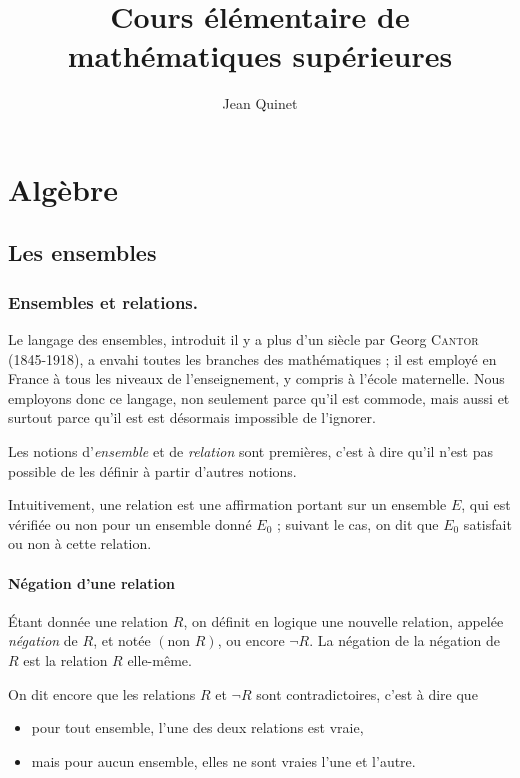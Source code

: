 \documentclass[12pt,parskip=full,chapterprefix=true,a5paper]{scrbook}
\title{Cours élémentaire de mathématiques supérieures}
\author{Jean Quinet}
\begin{document}
\frontmatter

\maketitle
\tableofcontents

\mainmatter

\part{Algèbre}

\chapter{Les ensembles}

\section{Ensembles et relations.}

Le langage des ensembles, introduit il y a plus d'un siècle par Georg
\textsc{Cantor} (1845-1918), a envahi toutes les branches des mathématiques ; il
est employé en France à tous les niveaux de l'enseignement, y compris
à l'école maternelle. Nous employons donc ce langage, non seulement
parce qu'il est commode, mais aussi et surtout parce qu'il est est
désormais impossible de l'ignorer.

Les notions d'\emph{ensemble} et de \emph{relation} sont premières,
c'est à dire qu'il n'est pas possible de les définir à partir d'autres
notions.

Intuitivement, une relation est une affirmation portant sur un
ensemble \(E\), qui est vérifiée ou non pour un ensemble donné \(E_0\)
; suivant le cas, on dit que \(E_0\) satisfait ou non à cette
relation.

\subsection*{Négation d'une relation}

Étant donnée une relation \(R\), on définit en logique une nouvelle
relation, appelée \emph{négation} de \(R\), et notée
\((\text{non }R)\), ou encore \(\neg R\). La négation de la négation
de \(R\) est la relation \(R\) elle-même.

On dit encore que les relations \(R\) et \(\neg R\) sont
contradictoires, c'est à dire que
\begin{itemize}
\item pour tout ensemble, l'une des deux relations est vraie,
\item mais pour aucun ensemble, elles ne sont vraies l'une et l'autre.
\end{itemize}
\end{document}
